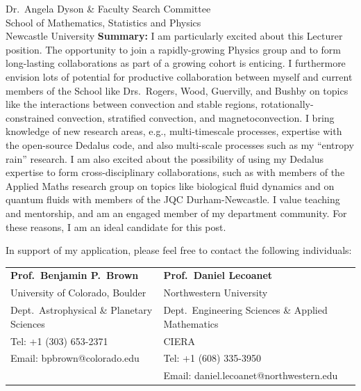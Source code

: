 \documentclass[12pt]{letter}
\begin{document}
\begin{letter}{
        Dr.~Angela Dyson \& Faculty Search Committee \\
        School of Mathematics, Statistics and Physics \\
        Newcastle University}
    \textbf{Summary: } I am particularly excited about this Lecturer position.
    The opportunity to join a rapidly-growing Physics group and to form long-lasting collaborations as part of a growing cohort is enticing.
    I furthermore envision lots of potential for productive collaboration between myself and current members of the School like Drs.~Rogers, Wood, Guervilly, and Bushby on topics like the interactions between convection and stable regions, rotationally-constrained convection, stratified convection, and magnetoconvection.
    I bring knowledge of new research areas, e.g., multi-timescale processes, expertise with the open-source Dedalus code, and also multi-scale processes such as my ``entropy rain'' research.
    I am also excited about the possibility of using my Dedalus expertise to form cross-disciplinary collaborations, such as with members of the Applied Maths research group on topics like biological fluid dynamics and on quantum fluids with members of the JQC Durham-Newcastle.
    I value teaching and mentorship, and am an engaged member of my department community.
    For these reasons, I am an ideal candidate for this post.

    In support of my application, please feel free to contact the following individuals:

    \footnotesize
    \begin{tabular}{ll}
        \textbf{Prof.~Benjamin P.~Brown}                        &\hspace{0.25in} \textbf{Prof.~Daniel Lecoanet}                     \\
        University of Colorado, Boulder                         &\hspace{0.25in} Northwestern University    \\
        \hspace{0.2in}Dept.~Astrophysical \& Planetary Sciences &\hspace{0.45in} Dept.~Engineering Sciences \& Applied Mathematics \\
        Tel: +1 (303) 653-2371                                    &\hspace{0.45in} CIERA                          \\
        Email: bpbrown@colorado.edu                             &\hspace{0.25in} Tel: +1 (608) 335-3950 \\
                                                                &\hspace{0.25in} Email: daniel.lecoanet@northwestern.edu             \\


\end{tabular}
\end{letter}
\end{document}
